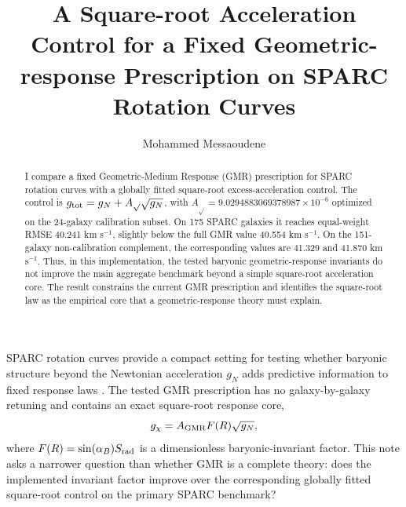 \documentclass[RNAAS]{aastex701}
\begin{document}
\pagestyle{plain}

\title{A Square-root Acceleration Control for a Fixed Geometric-response Prescription on SPARC Rotation Curves}

\author{Mohammed Messaoudene}

\begin{abstract}
I compare a fixed Geometric-Medium Response (GMR) prescription for SPARC rotation curves with a globally fitted square-root excess-acceleration control. The control is $g_{\rm tot}=g_N+A_{\sqrt{}}\sqrt{g_N}$, with $A_{\sqrt{}}=9.0294883069378987\times10^{-6}$ optimized on the 24-galaxy calibration subset. On 175 SPARC galaxies it reaches equal-weight RMSE 40.241 km s$^{-1}$, slightly below the full GMR value 40.554 km s$^{-1}$. On the 151-galaxy non-calibration complement, the corresponding values are 41.329 and 41.870 km s$^{-1}$. Thus, in this implementation, the tested baryonic geometric-response invariants do not improve the main aggregate benchmark beyond a simple square-root acceleration core. The result constrains the current GMR prescription and identifies the square-root law as the empirical core that a geometric-response theory must explain.
\end{abstract}


\maketitle
\pagestyle{plain}
\thispagestyle{plain}

SPARC rotation curves provide a compact setting for testing whether baryonic structure beyond the Newtonian acceleration $g_N$ adds predictive information to fixed response laws \citep{lelli2016,mcgaugh2016}. The tested GMR prescription has no galaxy-by-galaxy retuning and contains an exact square-root response core,
\begin{equation}
g_\chi = A_{\rm GMR}F(R)\sqrt{g_N},
\end{equation}
where $F(R)=\sin(\alpha_B)S_{\rm rad}$ is a dimensionless baryonic-invariant factor. This note asks a narrower question than whether GMR is a complete theory: does the implemented invariant factor improve over the corresponding globally fitted square-root control on the primary SPARC benchmark?
\end{document}
